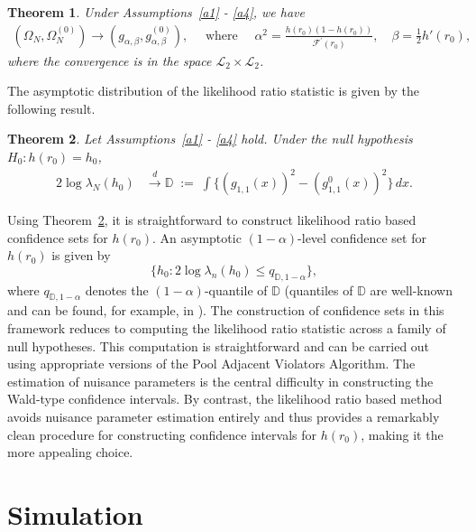 \documentclass[12pt]{amsart}
\theoremstyle{plain}
\newtheorem{theorem}{Theorem}[section]
\theoremstyle{remark}
\numberwithin{equation}{section}
\begin{document}
\begin{theorem}\label{thm2} Under Assumptions~\ref{a1} - \ref{a4}, we have
\begin{align*}
    \left(\Omega_N, \Omega^{(0)}_N\right) {\to} \left(g_{\alpha,\beta}, g^{(0)}_{\alpha,\beta}\right), \quad \text{ where } \quad 
    \alpha^2 = \frac{h\left(r_{0}\right)\left(1-h\left(r_{0}\right)\right)}{\mathcal{F}^\prime\left(r_{0}\right)}, \quad \beta = \frac{1}{2}h'(r_0),
\end{align*}
where the convergence is 
in the space $\mathcal{L}_2 \times \mathcal{L}_2$.
\end{theorem}

The asymptotic distribution of the likelihood ratio statistic is given by the following result.
\begin{theorem}\label{thm:lrt} Let Assumptions~\ref{a1} - \ref{a4} hold. Under the null hypothesis $H_0 : h(r_0) = h_0$,
\begin{align*}
2 \log \lambda_{N}(h_0)
& \stackrel{d}{\rightarrow} \mathbb{D} \;:=\; \int \Big\{ (g_{1,1}(x))^2 - (g^{0}_{1,1}(x))^2 \Big\}\, dx.
\end{align*}
\end{theorem}

Using Theorem~\ref{thm:lrt}, it is straightforward to construct likelihood ratio based 
confidence sets for \(h(r_{0})\). 
An asymptotic \((1-\alpha)\)-level confidence set for \(h(r_{0})\) is given by
\[
\big\{h_0 : 2 \log \lambda_{n}(h_0) \leq q_{\mathbb{D},1-\alpha} \big\},
\]
where \(q_{\mathbb{D},1-\alpha}\) denotes the \((1-\alpha)\)-quantile of \(\mathbb{D}\)
(quantiles of $\mathbb{D}$ are well-known and can be found, for example, in \cite{banerjee2001likelihood}). 
The construction of confidence sets in this framework reduces to computing the likelihood 
ratio statistic across a family of null hypotheses. This computation is straightforward and 
can be carried out using appropriate versions of the Pool Adjacent Violators Algorithm. 
The estimation of nuisance parameters is the central difficulty in constructing the Wald-type 
confidence intervals. 
By contrast, the likelihood ratio based method avoids nuisance parameter estimation entirely and 
thus provides a remarkably clean  
procedure for constructing confidence intervals 
for \(h(r_{0})\), making it the more appealing choice.  

\section{Simulation}\label{sec4}
\end{document}
